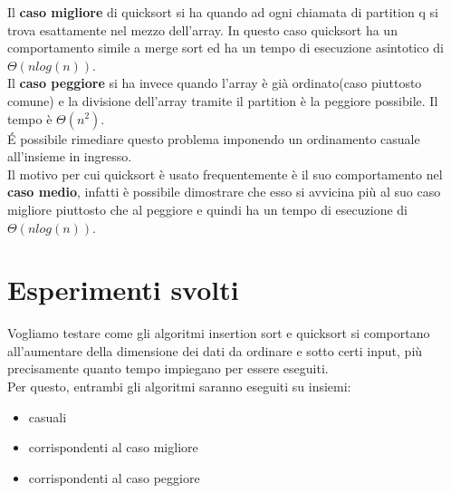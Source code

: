 \documentclass[]{article}
\begin{document}
Il \textbf{caso migliore} di quicksort si ha quando ad ogni chiamata di partition q si trova esattamente nel mezzo dell'array. In questo caso quicksort ha un comportamento simile a merge sort ed ha un tempo di esecuzione asintotico di $\Theta(nlog(n))$.\\
Il \textbf{caso peggiore} si ha invece quando l'array è già ordinato(caso piuttosto comune) e la divisione dell'array tramite il partition è la peggiore possibile. Il tempo è $\Theta(n^2)$.\\
\'E possibile rimediare questo problema imponendo un ordinamento casuale all'insieme in ingresso.\\
Il motivo per cui quicksort è usato frequentemente è il suo comportamento nel \textbf{caso medio}, infatti è possibile dimostrare che esso si avvicina più al suo caso migliore piuttosto che al peggiore e quindi ha un tempo di esecuzione di $\Theta(nlog(n))$.\\
\section{Esperimenti svolti}
Vogliamo testare come gli algoritmi insertion sort e quicksort si comportano all'aumentare della dimensione dei dati da ordinare e sotto certi input, più precisamente quanto tempo impiegano per essere eseguiti.\\
Per questo, entrambi gli algoritmi saranno eseguiti su insiemi:
\begin{itemize}
\item casuali
\item corrispondenti al caso migliore
\item corrispondenti al caso peggiore
\end{itemize}
\end{document}
